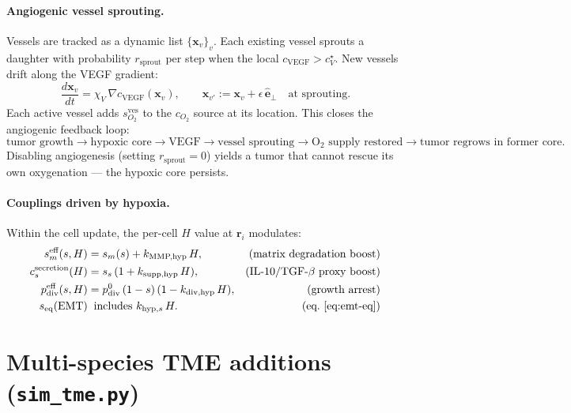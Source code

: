 \documentclass[11pt,letterpaper]{article}
\begin{document}
\paragraph{Angiogenic vessel sprouting.}
Vessels are tracked as a dynamic list $\{\mathbf{x}_v\}_v$. Each
existing vessel sprouts a daughter with probability $r_{\text{sprout}}$
per step when the local $c_{\text{VEGF}} > c_V^\star$. New vessels drift
along the VEGF gradient:
\begin{equation}
\boxed{\;
\frac{d \mathbf{x}_v}{dt}
   = \chi_V\,\nabla c_{\text{VEGF}}(\mathbf{x}_v),
\qquad
\mathbf{x}_{v'} \mathrel{:=}
   \mathbf{x}_v + \epsilon\,\hat{\mathbf{e}}_\perp \quad \text{at sprouting.}
\;}
\label{eq:angio}
\end{equation}
Each active vessel adds $s_{O_2}^{\text{ves}}$ to the $c_{O_2}$ source
at its location. This closes the angiogenic feedback loop:
\begin{equation*}
\text{tumor growth} \to \text{hypoxic core} \to \text{VEGF} \to
\text{vessel sprouting} \to \text{O}_2 \text{ supply restored}
\to \text{tumor regrows in former core.}
\end{equation*}
Disabling angiogenesis (setting $r_{\text{sprout}}=0$) yields a tumor
that cannot rescue its own oxygenation --- the hypoxic core persists.

\paragraph{Couplings driven by hypoxia.}
Within the cell update, the per-cell $H$ value at $\mathbf{r}_i$ modulates:
\begin{align}
s_m^{\text{eff}}(s, H)         &= s_m(s) + k_{\text{MMP,hyp}}\,H, &\text{(matrix degradation boost)}\\
c_s^{\text{secretion}}(H)      &= s_s\,(1 + k_{\text{supp,hyp}}\,H), &\text{(IL-10/TGF-$\beta$ proxy boost)}\\
p_{\text{div}}^{\text{eff}}(s, H) &= p_{\text{div}}^0\,(1-s)\,(1 - k_{\text{div,hyp}}\,H), &\text{(growth arrest)}\\
s_{\text{eq}} \text{(EMT)}     &\;\;\text{includes }k_{\text{hyp},s}\,H. &\text{(eq.~\ref{eq:emt-eq})}
\end{align}

\section{Multi-species TME additions (\texttt{sim\_tme.py})}
\label{sec:m2-tme}
\end{document}
